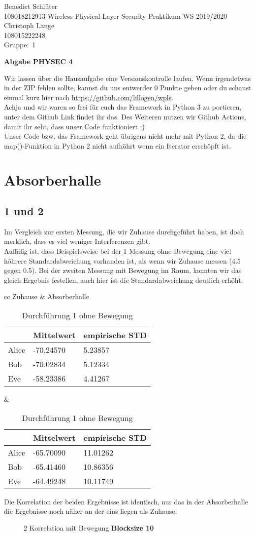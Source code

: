 \documentclass[12pt,a4paper]{article}
\newcommand{\student}{Benedict Schlüter\\ 108018212913 } %
\newcommand{\partner}{Christoph Lange\\ 108015222248} %
\newcommand{\group}{1} %
\newcommand{\hwheadtwo}{$ $
  \vspace{-2cm}
  
\noindent \student \qquad \qquad  Wireless Physical Layer Security Praktikum \hfill WS 2019/2020 \\
\noindent \partner \\
\noindent Gruppe:~\group\\
$ $

  
\begin{center}    
{\Large \bf Abgabe PHYSEC 4}
\end{center}
}
\begin{document}
\hwheadtwo
Wir lassen über die Hausaufgabe eine Versionskontrolle laufen. Wenn irgendetwas in der ZIP fehlen sollte, kannst du uns entwerder 0 Punkte geben oder du schaust einmal kurz hier nach \url{https://github.com/lillogen/wpls}.\\
Achja und wir waren so frei für euch das Framework in Python 3 zu portieren, unter dem Github Link findet ihr das. Des Weiteren nutzen wir Github Actions, damit ihr seht, dass unser Code funktioniert ;)\\
Unser Code bzw. das Framework geht übrigens nicht mehr mit Python 2, da die map()-Funktion in Python 2 nicht aufhöhrt wenn ein Iterator erschöpft ist.
\tableofcontents
\newpage
\section{Absorberhalle}
\subsection*{1 und 2 }
Im Vergleich zur ersten Messung, die wir Zuhause durchgeführt haben, ist doch merklich, dass es viel weniger Interferenzen gibt.\\ 
Auffälig ist, dass Beispielsweise bei der 1 Messung ohne Bewegung eine viel höhrere Standardabweichung vorhanden ist, als wenn wir Zuhause messen (4.5 gegen 0.5). Bei der zweiten Messung mit Bewegung im Raum, konnten wir das gleich Ergebnis festellen, auch hier ist die Standardabweichung deutlich erhöht.
\begin{table}[H]
\centering
\begin{tabular}{ cc }
Zuhause & Absorberhalle  \\
\begin{tabular}{l|l|l}
& Mittelwert & empirische STD \\
\hline
Alice & -70.24570 & 5.23857 \\
\hline
Bob & -70.02834 & 5.12334 \\
\hline
Eve & -58.23386 & 4.41267 \\
\end{tabular} &
\begin{tabular}{l|l|l}
& Mittelwert & empirische STD \\
\hline
Alice & -65.70090 & 11.01262 \\
\hline
Bob & -65.41460 & 10.86356 \\
\hline
Eve & -64.49248 & 10.11749 \\
\end{tabular}
\end{tabular}
\caption{Durchführung 1 ohne Bewegung}
\end{table}
Die Korrelation der beiden Ergebnisse ist identisch, nur das in der Absorberhalle die Ergebnisse noch näher an der eins liegen als Zuhause.
\begin{figure}[H]
\centering
{}   \qquad
{}
\caption{2 Korrelation mit Bewegung  \textbf{Blocksize 10}}
\label{fig:2}
\end{figure}
\end{document}
